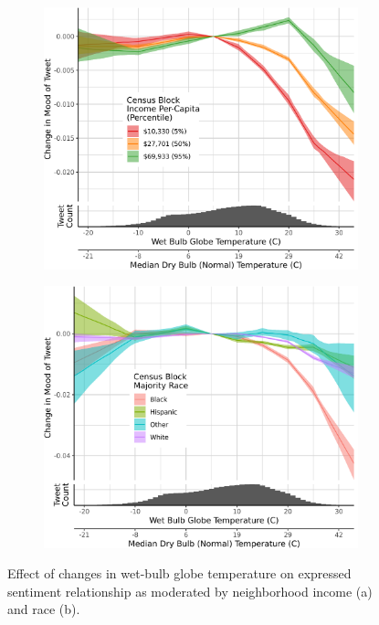 \documentclass[fleqn,10pt]{wlscirep}
\begin{document}
\begin{figure}[H]
\centering
\begin{subfigure}{.5\textwidth}
  \centering
  \includegraphics[width=\linewidth]{../res/wbgt-income.png}
  \caption{}
  \label{fig:sub1}
\end{subfigure}%
\begin{subfigure}{.5\textwidth}
  \centering
  \includegraphics[width=\linewidth]{../res/wbgt-race_q.png}
  \caption{}
  \label{fig:sub2}
\end{subfigure}
\caption{Effect of changes in wet-bulb globe temperature on expressed sentiment relationship as moderated by neighborhood income (a) and race (b).}
\label{fig:test}
\end{figure}
\end{document}
